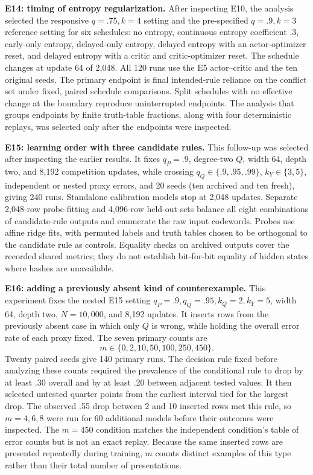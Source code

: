 \textbf{E14: timing of entropy regularization.} After inspecting E10, the analysis selected the responsive $q=.75,k=4$ setting and the pre-specified $q=.9,k=3$ reference setting for six schedules: no entropy, continuous entropy coefficient $.3$, early-only entropy, delayed-only entropy, delayed entropy with an actor-optimizer reset, and delayed entropy with a critic and critic-optimizer reset. The schedule changes at update 64 of 2,048. All 120 runs use the E5 actor--critic and the ten original seeds. The primary endpoint is final intended-rule reliance on the conflict set under fixed, paired schedule comparisons. Split schedules with no effective change at the boundary reproduce uninterrupted endpoints. The analysis that groups endpoints by finite truth-table fractions, along with four deterministic replays, was selected only after the endpoints were inspected.

\textbf{E15: learning order with three candidate rules.} This follow-up was selected after inspecting the earlier results. It fixes $q_P=.9$, degree-two $Q$, width 64, depth two, and 8,192 competition updates, while crossing $q_Q\in\{.9,.95,.99\}$, $k_Y\in\{3,5\}$, independent or nested proxy errors, and 20 seeds (ten archived and ten fresh), giving 240 runs. Standalone calibration models stop at 2,048 updates. Separate 2,048-row probe-fitting and 4,096-row held-out sets balance all eight combinations of candidate-rule outputs and enumerate the raw input codewords. Probes use affine ridge fits, with permuted labels and truth tables chosen to be orthogonal to the candidate rule as controls. Equality checks on archived outputs cover the recorded shared metrics; they do not establish bit-for-bit equality of hidden states where hashes are unavailable.

\textbf{E16: adding a previously absent kind of counterexample.} This experiment fixes the nested E15 setting $q_P=.9,q_Q=.95,k_Q=2,k_Y=5$, width 64, depth two, $N=10,000$, and 8,192 updates. It inserts rows from the previously absent case in which only $Q$ is wrong, while holding the overall error rate of each proxy fixed. The seven primary counts are
\[
m\in\{0,2,10,50,100,250,450\}.
\]
Twenty paired seeds give 140 primary runs. The decision rule fixed before analyzing these counts required the prevalence of the conditional rule to drop by at least .30 overall and by at least .20 between adjacent tested values. It then selected untested quarter points from the earliest interval tied for the largest drop. The observed .55 drop between 2 and 10 inserted rows met this rule, so $m=4,6,8$ were run for 60 additional models before their outcomes were inspected. The $m=450$ condition matches the independent condition's table of error counts but is not an exact replay. Because the same inserted rows are presented repeatedly during training, $m$ counts distinct examples of this type rather than their total number of presentations.

